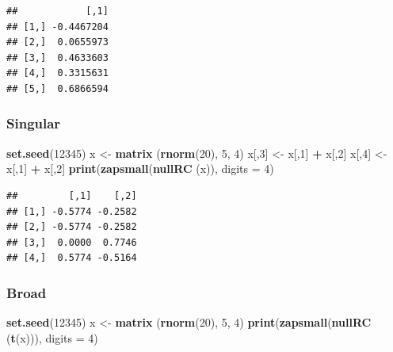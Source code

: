\documentclass[12pt,]{article}
\newenvironment{Shaded}{\begin{snugshade}}{\end{snugshade}}
\newcommand{\KeywordTok}[1]{\textcolor[rgb]{0.13,0.29,0.53}{\textbf{#1}}}
\newcommand{\DataTypeTok}[1]{\textcolor[rgb]{0.13,0.29,0.53}{#1}}
\newcommand{\DecValTok}[1]{\textcolor[rgb]{0.00,0.00,0.81}{#1}}
\newcommand{\StringTok}[1]{\textcolor[rgb]{0.31,0.60,0.02}{#1}}
\newcommand{\OperatorTok}[1]{\textcolor[rgb]{0.81,0.36,0.00}{\textbf{#1}}}
\newcommand{\NormalTok}[1]{#1}
\begin{document}
\begin{verbatim}
##            [,1]
## [1,] -0.4467204
## [2,]  0.0655973
## [3,]  0.4633603
## [4,]  0.3315631
## [5,]  0.6866594
\end{verbatim}

\subsubsection{Singular}\label{singular-2}

\begin{Shaded}
\begin{Highlighting}[]
\KeywordTok{set.seed}\NormalTok{(}\DecValTok{12345}\NormalTok{)}
\NormalTok{x <-}\StringTok{ }\KeywordTok{matrix}\NormalTok{ (}\KeywordTok{rnorm}\NormalTok{(}\DecValTok{20}\NormalTok{), }\DecValTok{5}\NormalTok{, }\DecValTok{4}\NormalTok{)}
\NormalTok{x[,}\DecValTok{3}\NormalTok{] <-}\StringTok{ }\NormalTok{x[,}\DecValTok{1}\NormalTok{] }\OperatorTok{+}\StringTok{ }\NormalTok{x[,}\DecValTok{2}\NormalTok{]}
\NormalTok{x[,}\DecValTok{4}\NormalTok{] <-}\StringTok{ }\NormalTok{x[,}\DecValTok{1}\NormalTok{] }\OperatorTok{+}\StringTok{ }\NormalTok{x[,}\DecValTok{2}\NormalTok{]}
\KeywordTok{print}\NormalTok{(}\KeywordTok{zapsmall}\NormalTok{(}\KeywordTok{nullRC}\NormalTok{ (x)), }\DataTypeTok{digits =} \DecValTok{4}\NormalTok{)}
\end{Highlighting}
\end{Shaded}

\begin{verbatim}
##         [,1]    [,2]
## [1,] -0.5774 -0.2582
## [2,] -0.5774 -0.2582
## [3,]  0.0000  0.7746
## [4,]  0.5774 -0.5164
\end{verbatim}

\subsubsection{Broad}\label{broad-2}

\begin{Shaded}
\begin{Highlighting}[]
\KeywordTok{set.seed}\NormalTok{(}\DecValTok{12345}\NormalTok{)}
\NormalTok{x <-}\StringTok{ }\KeywordTok{matrix}\NormalTok{ (}\KeywordTok{rnorm}\NormalTok{(}\DecValTok{20}\NormalTok{), }\DecValTok{5}\NormalTok{, }\DecValTok{4}\NormalTok{)}
\KeywordTok{print}\NormalTok{(}\KeywordTok{zapsmall}\NormalTok{(}\KeywordTok{nullRC}\NormalTok{ (}\KeywordTok{t}\NormalTok{(x))), }\DataTypeTok{digits =} \DecValTok{4}\NormalTok{)}
\end{Highlighting}
\end{Shaded}
\end{document}

